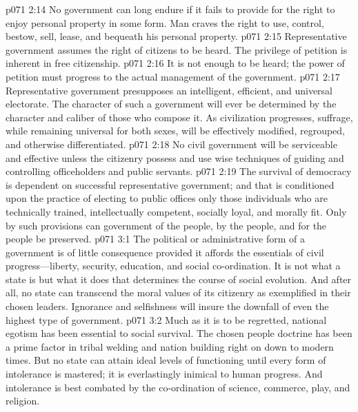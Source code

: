 \pc \vs p071 2:14 \bibnobreakspace {} No government can long endure if it fails to provide for the right to enjoy personal property in some form. Man craves the right to use, control, bestow, sell, lease, and bequeath his personal property.
\pc \vs p071 2:15 \bibnobreakspace {} Representative government assumes the right of citizens to be heard. The privilege of petition is inherent in free citizenship.
\pc \vs p071 2:16 \bibnobreakspace {} It is not enough to be heard; the power of petition must progress to the actual management of the government.
\pc \vs p071 2:17 \bibnobreakspace {} Representative government presupposes an intelligent, efficient, and universal electorate. The character of such a government will ever be determined by the character and caliber of those who compose it. As civilization progresses, suffrage, while remaining universal for both sexes, will be effectively modified, regrouped, and otherwise differentiated.
\pc \vs p071 2:18 \bibnobreakspace {} No civil government will be serviceable and effective unless the citizenry possess and use wise techniques of guiding and controlling officeholders and public servants.
\pc \vs p071 2:19 \bibnobreakspace {} The survival of democracy is dependent on successful representative government; and that is conditioned upon the practice of electing to public offices only those individuals who are technically trained, intellectually competent, socially loyal, and morally fit. Only by such provisions can government of the people, by the people, and for the people be preserved.
\vs p071 3:1 The political or administrative form of a government is of little consequence provided it affords the essentials of civil progress---liberty, security, education, and social co\hyp{}ordination. It is not what a state is but what it does that determines the course of social evolution. And after all, no state can transcend the moral values of its citizenry as exemplified in their chosen leaders. Ignorance and selfishness will insure the downfall of even the highest type of government.
\vs p071 3:2 Much as it is to be regretted, national egotism has been essential to social survival. The chosen people doctrine has been a prime factor in tribal welding and nation building right on down to modern times. But no state can attain ideal levels of functioning until every form of intolerance is mastered; it is everlastingly inimical to human progress. And intolerance is best combated by the co\hyp{}ordination of science, commerce, play, and religion.
